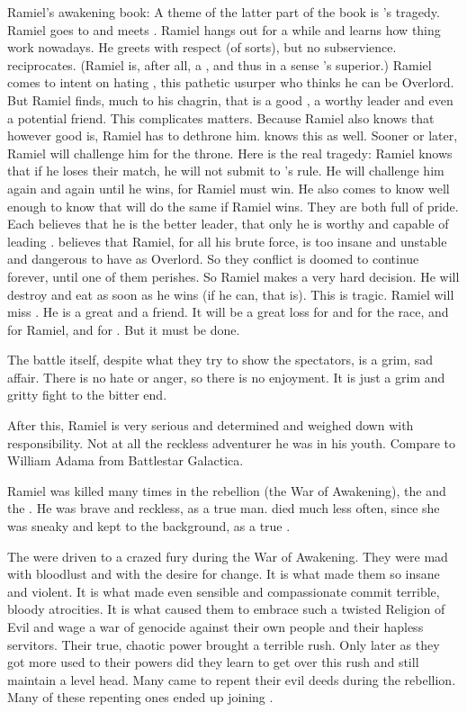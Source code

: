 Ramiel's awakening book:
A theme of the latter part of the book is \Dasteron's tragedy.
Ramiel goes to \Mystraacht and meets \Dasteron.
Ramiel hangs out for a while and learns how thing work nowadays.
He greets \Dasteron with respect (of sorts), but no subservience.
\Dasteron reciprocates. (Ramiel is, after all, a \sathariah, and thus in a sense \Dasteron's superior.)
Ramiel comes to \Mystraacht intent on hating \Dasteron, this pathetic usurper who thinks he can be Overlord.
But Ramiel finds, much to his chagrin, that \Dasteron is a good \resphan, a worthy leader and even a potential friend.
This complicates matters.
Because Ramiel also knows that however good \Dasteron is, Ramiel has to dethrone him.
\Dasteron knows this as well.
Sooner or later, Ramiel will challenge him for the throne.
Here is the real tragedy:
Ramiel knows that if he loses their match, he will not submit to \Dasteron's rule.
He will challenge him again and again until he wins, for Ramiel must win.
He also comes to know \Dasteron well enough to know that \Dasteron will do the same if Ramiel wins.
They are both full of pride.
Each believes that he is the better leader, that only he is worthy and capable of leading \Mystraacht.
\Dasteron believes that Ramiel, for all his brute force, is too insane and unstable and dangerous to have as Overlord.
So they conflict is doomed to continue forever, until one of them perishes.
So Ramiel makes a very hard decision.
He will destroy and eat \Dasteron as soon as he wins (if he can, that is). 
This is tragic.
Ramiel will miss \Dasteron.
He is a great \resphan and a friend.
It will be a great loss for \Mystraacht and for the \resphan race, and for Ramiel, and for \Cishiel.
But it must be done.

The battle itself, despite what they try to show the spectators, is a grim, sad affair.
There is no hate or anger, so there is no enjoyment.
It is just a grim and gritty fight to the bitter end.

After this, Ramiel is very serious and determined and weighed down with responsibility.
Not at all the reckless adventurer he was in his youth.
Compare to William Adama from Battlestar Galactica.

Ramiel was killed many times in the rebellion (the War of Awakening), the \secondbanewar and the \resphanwars. 
He was brave and reckless, as a true \resphan man.
\Shiaraid died much less often, since she was sneaky and kept to the background, as a true \resvil.

The \resphain were driven to a crazed fury during the War of Awakening.
They were mad with bloodlust and with the desire for change.
It is what made them so insane and violent.
It is what made even sensible and compassionate \resphain commit terrible, bloody atrocities.
It is what caused them to embrace such a twisted Religion of Evil and wage a war of genocide against their own people and their hapless servitors.
Their true, chaotic power brought a terrible rush.
Only later as they got more used to their powers did they learn to get over this rush and still maintain a level head.
Many came to repent their evil deeds during the rebellion.
Many of these repenting ones ended up joining \Kezerad.



